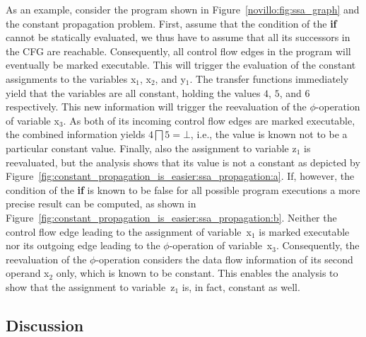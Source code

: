 As an example, consider the program shown in Figure~\ref{novillo:fig:ssa_graph}
and the constant propagation problem. First,
assume that the condition of the \textbf{if} cannot be statically evaluated, we
thus have to assume that all its successors in the CFG are reachable.
Consequently, all control flow edges in the program will eventually be marked
executable. This will trigger the evaluation of the constant assignments to
the variables x$_1$,  x$_2$, and y$_1$. The transfer functions immediately yield
that the variables are all constant, holding the values $4$, $5$, and $6$
respectively. This new information will trigger the reevaluation of the
$\phi$-operation of variable x$_3$. As both of its incoming control flow edges
are marked executable, the combined information yields $4 \bigsqcap 5 = \bot$,
i.e., the value is known not to be a particular constant value. Finally, also
the assignment
to variable z$_1$ is reevaluated, but the analysis shows that its value is not a
constant as depicted by Figure~\ref{fig:constant_propagation_is_easier:ssa_propagation:a}. If, however,
the condition of the \textbf{if} is known to be false for all possible program
executions a more precise result can be computed, as shown in
Figure~\ref{fig:constant_propagation_is_easier:ssa_propagation:b}. Neither the control flow edge
leading to the
assignment of variable~x$_1$ is marked executable nor its outgoing edge leading
to the $\phi$-operation of variable~x$_3$. Consequently, the reevaluation of
the $\phi$-operation considers the data flow information of its second operand
x$_2$ only, which is known to be constant. This enables the analysis
to show that the assignment to variable~z$_1$ is, in fact, constant as well.

\subsection{Discussion}

